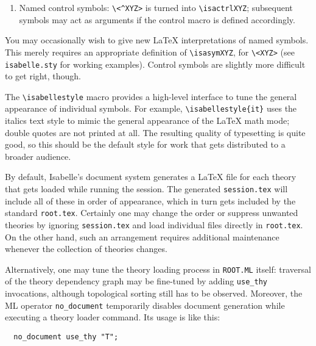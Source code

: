 \begin{isabellebody}
\begin{isamarkuptext}
\begin{enumerate}
  \item Named control symbols: \verb,\,\verb,<^XYZ>, is turned into
  \verb,\isactrlXYZ,; subsequent symbols may act as arguments if the
  control macro is defined accordingly.

  \end{enumerate}

  You may occasionally wish to give new {\LaTeX} interpretations of
  named symbols.  This merely requires an appropriate definition of
  \verb,\isasymXYZ,, for \verb,\,\verb,<XYZ>, (see
  \texttt{isabelle.sty} for working examples).  Control symbols are
  slightly more difficult to get right, though.

  \medskip The \verb,\isabellestyle, macro provides a high-level
  interface to tune the general appearance of individual symbols.  For
  example, \verb,\isabellestyle{it}, uses the italics text style to
  mimic the general appearance of the {\LaTeX} math mode; double
  quotes are not printed at all.  The resulting quality of typesetting
  is quite good, so this should be the default style for work that
  gets distributed to a broader audience.%
\end{isamarkuptext}%
\isamarkuptrue%
%
\isamarkuptrue%
%
\begin{isamarkuptext}%
By default, Isabelle's document system generates a {\LaTeX} file for
  each theory that gets loaded while running the session.  The
  generated \texttt{session.tex} will include all of these in order of
  appearance, which in turn gets included by the standard
  \texttt{root.tex}.  Certainly one may change the order or suppress
  unwanted theories by ignoring \texttt{session.tex} and load
  individual files directly in \texttt{root.tex}.  On the other hand,
  such an arrangement requires additional maintenance whenever the
  collection of theories changes.

  Alternatively, one may tune the theory loading process in
  \texttt{ROOT.ML} itself: traversal of the theory dependency graph
  may be fine-tuned by adding \verb,use_thy, invocations, although
  topological sorting still has to be observed.  Moreover, the ML
  operator \verb,no_document, temporarily disables document generation
  while executing a theory loader command.  Its usage is like this:

\begin{verbatim}
  no_document use_thy "T";
\end{verbatim}


\end{isamarkuptext}
\end{isabellebody}

